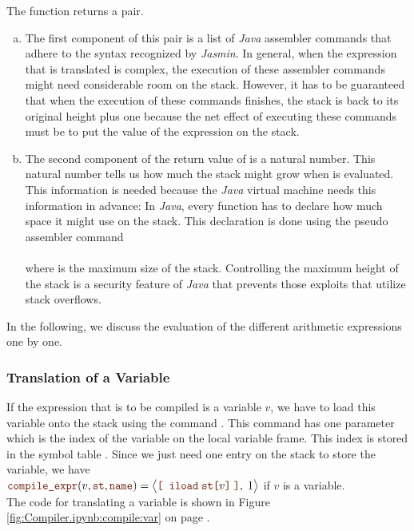 The function  returns a pair.  
\begin{enumerate}[(a)]
\item The first component of this pair is a list of \textsl{Java} 
      assembler commands that adhere to the syntax recognized by \textsl{Jasmin}.  In general, when the
      expression that is translated is complex, the execution of these assembler commands might need
      considerable room on the stack.  However, it has to be guaranteed that when the execution of these
      commands finishes, the stack is back to its original height plus one because the net 
      effect of executing these commands must be to put the value of the expression on the stack.
\item The second component of the return value of  is a natural number.
      This natural number tells us how much the stack might grow when  is evaluated.
      This information is needed because the \textsl{Java} virtual machine needs this information in advance:
      In \textsl{Java}, every function has to declare how much space it might use on the stack.
      This declaration is done using the pseudo assembler command
      \\[0.2cm]
      \hspace*{1.3cm}
       
      \\[0.2cm]
      where  is the maximum size of the stack.  Controlling the 
      maximum height of the stack is a security feature of \textsl{Java} that prevents those exploits that
      utilize stack overflows.
\end{enumerate}
In the following, we discuss the evaluation of the different arithmetic expressions one by one.


\subsubsection{Translation of a Variable}
If the expression that is to be compiled is a variable $v$, we have to load this variable onto the stack using
the command .  This command has one parameter which is the index of the variable on the local
variable frame.  This index is stored in the symbol table .  Since we just need one entry on the
stack to store the variable, we have
\\[0.2cm]
\hspace*{1.3cm}
$\mytt{compile\_expr}(v, \mytt{st}, \mytt{name}) = 
 \bigl\langle\mytt{[}\;\; \mytt{iload}\; \mytt{st[}v\mytt{]}\; \mytt{]}, \; 1\bigr\rangle$ \quad
 if $v$ is a variable.
\\[0.2cm]
The code for translating a variable is shown in Figure \ref{fig:Compiler.ipynb:compile:var} on page
\pageref{fig:Compiler.ipynb:compile:var}.

